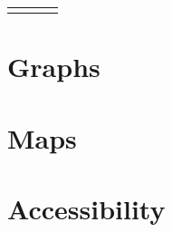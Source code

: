 \documentclass[
]{book}
\begin{document}
\begin{table}
\begin{longtable}{|p{2.95in}|p{1.58in}|p{1.54in}|p{1.28in}}
\noalign{\global\setlength{\arrayrulewidth}{2pt}}\arrayrulecolor[HTML]{000000}\cline{1-4}

\end{longtable}

\end{table}

\hypertarget{graphs}{%
\chapter{Graphs}\label{graphs}}

\hypertarget{maps}{%
\chapter{Maps}\label{maps}}

\hypertarget{access}{%
\chapter{Accessibility}\label{access}}

  
\end{document}
